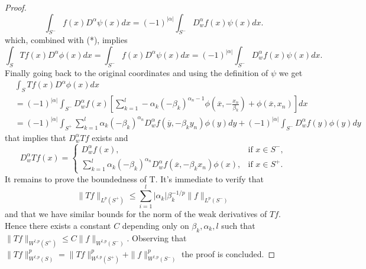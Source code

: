\documentclass[12pt]{article}
\theoremstyle{definition}
\begin{document}
\begin{proof}
\[ \int_{S^-}  f(x)D^{\alpha}\psi(x) dx = (-1)^{|\alpha|}\int_{S^-} D^\alpha_wf(x)\psi(x)  dx.  \]
which, combined with (*), implies
\[ \int_S Tf(x)D^{\alpha}\phi(x)dx=  \int_{S^-}  f(x)D^{\alpha}\psi(x) dx = (-1)^{|\alpha|}\int_{S^-} D^\alpha_wf(x)\psi(x)  dx. \]
Finally going back to the original coordinates and using the definition of $\psi$ we get
\begin{align*}
& \int_S Tf(x)D^{\alpha}\phi(x)dx \\ 
&= (-1)^{|\alpha|} \int_{S^-}D^\alpha_w f(x) \left[\sum_{k=1}^l -\alpha_k (-\beta_k)^{\alpha_n-1}\phi \left( \overline x,-\frac{x_n}{\beta_k} \right)+\phi(\overline x,x_n)\right] dx\\
					&= (-1)^{|\alpha|} \int_{S^+} \sum_{k=1}^l \alpha_k (-\beta_k)^{\alpha_n} D^\alpha_w f(\overline y,-\beta_k y_n)\phi(y)dy +(-1)^{|\alpha|} \int_{S^-} D^\alpha_w f(y)\phi(y) dy
\end{align*}
that implies that $D^\alpha_wTf$ exists and 
\[ D^\alpha_wTf(x)= \begin{cases}
			 D^\alpha_w f(x),	& \text{if } x \in S^-, \\
			\sum_{k=1}^l \alpha_k (-\beta_k)^{\alpha_n} D^\alpha_w f(\overline x,-\beta_k x_n)\phi(x), & \text{if }x \in S^+.
		\end{cases}
 \]
It remains to prove the boundedness of  T. It's immediate to verify that
\[ \| Tf \|_{L^p(S^+)}\le \sum_{i=1}^l |\alpha_k|\beta_k^{-1/p} \| f\|_{L^p(S^-)} \] 
and that we have similar bounds for the norm of the weak derivatives of $Tf$. Hence there exists a constant $C$ depending only on $\beta_k,\alpha_k,l$ such that $\| Tf\|_{W^{l,p}(S^+)}\le C \| f\|_{W^{l,p}(S^-)} $. Observing that $\| Tf\|^p_{W^{l,p}(S)}=\| Tf\|^p_{W^{l,p}(S^+)}+\|f\|^p_{W^{l,p}(S^-)}$ the proof is concluded.
\end{proof}
\end{document}
